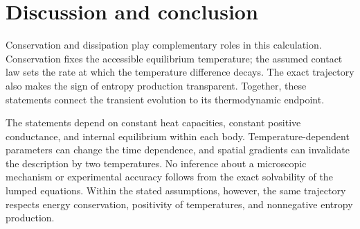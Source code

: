 \section{Discussion and conclusion}
Conservation and dissipation play complementary roles in this calculation. Conservation fixes the accessible equilibrium temperature; the assumed contact law sets the rate at which the temperature difference decays. The exact trajectory also makes the sign of entropy production transparent. Together, these statements connect the transient evolution to its thermodynamic endpoint.

The statements depend on constant heat capacities, constant positive conductance, and internal equilibrium within each body. Temperature-dependent parameters can change the time dependence, and spatial gradients can invalidate the description by two temperatures. No inference about a microscopic mechanism or experimental accuracy follows from the exact solvability of the lumped equations. Within the stated assumptions, however, the same trajectory respects energy conservation, positivity of temperatures, and nonnegative entropy production.
